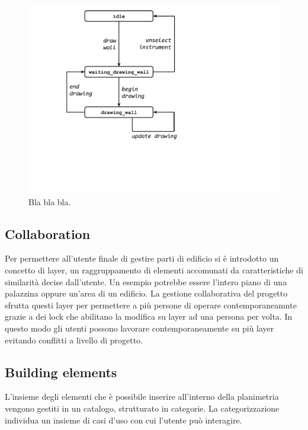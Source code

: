 \begin{figure}[!t]
\centering
\includegraphics[width=\linewidth]{contents/images/uc_draw_wall}

\caption{Bla bla bla.}
\label{fig_sim}
\end{figure}




\subsection{Collaboration}
    Per permettere all'utente finale di gestire parti di edificio si è introdotto un concetto di layer, un raggruppamento di elementi accomunati da caratteristiche di similarità decise dall'utente. Un esempio potrebbe essere l'intero piano di una palazzina oppure un'area di un edificio. La gestione collaborativa del progetto sfrutta questi layer per permettere a più persone di operare contemporaneamnte grazie a dei lock che abilitano la modifica su layer ad una persona per volta. In questo modo gli utenti possono lavorare contemporaneamente su più layer evitando conflitti a livello di progetto.


\subsection{Building elements}

L'insieme degli elementi che è possibile inserire all'interno della planimetria vengono gestiti in un catalogo, strutturato in categorie.
La categorizzazione individua un insieme di casi d'uso con cui l'utente può interagire.

